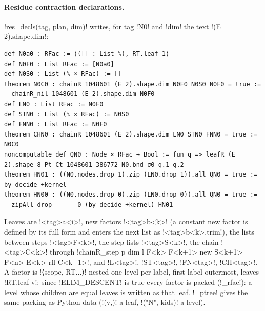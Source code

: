 {{{\paragraph{Residue contraction declarations.} \lexpy!res_decls(tag, plan, dim)! writes, for tag
\lexlean!N0! and \lexlean!dim! the text \lexlean!(E 2).shape.dim!:
\begin{lstlisting}[style=lexlean]
def N0a0 : RFac := ⟨([] : List ℕ), RT.leaf 1⟩
def N0F0 : List RFac := [N0a0]
def N0S0 : List (ℕ × RFac) := []
theorem N0C0 : chainR 1048601 (E 2).shape.dim N0F0 N0S0 N0F0 = true :=
  chainR_nil 1048601 (E 2).shape.dim N0F0
def LN0 : List RFac := N0F0
def STN0 : List (ℕ × RFac) := N0S0
def FNN0 : List RFac := N0F0
theorem CHN0 : chainR 1048601 (E 2).shape.dim LN0 STN0 FNN0 = true := N0C0
noncomputable def QN0 : Node × RFac → Bool := fun q => leafR (E 2).shape 8 Pt Ct 1048601 386772 N0.bnd σ0 q.1 q.2
theorem HN01 : ((N0.nodes.drop 1).zip (LN0.drop 1)).all QN0 = true := by decide +kernel
theorem HN00 : ((N0.nodes.drop 0).zip (LN0.drop 0)).all QN0 = true :=
  zipAll_drop _ _ _ 0 (by decide +kernel) HN01
\end{lstlisting}
Leaves are \lexlean!<tag>a<i>!, new factors \lexlean!<tag>b<k>! (a constant new factor is defined by
its full form and enters the next list as \lexlean!<tag>b<k>.trim!), the lists between steps
\lexlean!<tag>F<k>!, the step lists \lexlean!<tag>S<k>!, the chain \lexlean!<tag>C<k>! through
\lexlean!chainR_step p dim l F<k> F<k+1> new S<k+1> F<n> E<k> rfl C<k+1>!, and
\lexlean!L<tag>!, \lexlean!ST<tag>!, \lexlean!FN<tag>!, \lexlean!CH<tag>!. A factor is
\lexlean!⟨scope, RT...⟩! nested one level per label, first label outermost, leaves
\lexlean!RT.leaf v!; since \lexpy!ELIM_DESCENT! is true every factor is packed (\lexpy!_rfac!): a level
whose children are equal leaves is written as that leaf. \lexpy!_ptree! gives the same packing as
Python data (\lexcode!(v,)! a leaf, \lexcode!("N", kids)! a level).

}}}
